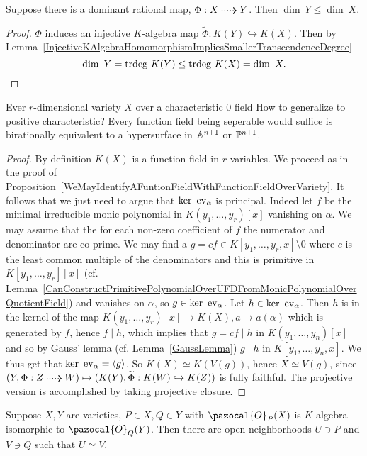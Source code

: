     \begin{proposition}
        Suppose there is a dominant rational map, $\Phi: X\dottedarrow Y$. Then $\dim\ Y \leq \dim \ X$.
    \end{proposition}
    \begin{proof}
        $\Phi$ induces an injective $K$-algebra map $\widetilde{\Phi}: K(Y)\hookrightarrow K(X)$. Then by Lemma~\ref{InjectiveKAlgebraHomomorphismImpliesSmallerTranscendenceDegree} 
        $$\dim \ Y = \mathrm{trdeg }\ K(Y)\leq \mathrm{trdeg }\ K(X) = \dim \ X.$$
    \end{proof}
    \begin{proposition}
        Ever $r$-dimensional variety $X$ over a characteristic $0$ field {\Large How to generalize to positive characteristic? Every function field being seperable would suffice} is birationally equivalent to a hypersurface in $\mathbb{A}^{n+1}$ or $\mathbb{P}^{n+1}$.
    \end{proposition}
    \begin{proof}
        By definition $K(X)$ is a function field in $r$ variables. We proceed as in the proof of Proposition~\ref{WeMayIdentifyAFuntionFieldWithFunctionFieldOverVariety}. It follows that we just need to argue that $\ker \ \mathrm{ev}_\alpha$ is principal. Indeed let $f$ be the minimal irreducible monic polynomial in $K(y_1,\dots,y_r)[x]$ vanishing on $\alpha$. We may assume that the for each non-zero coefficient of $f$ the numerator and denominator are co-prime. We may find a $g=cf\in K[y_1,\dots,y_r,x]\setminus 0$ where $c$ is the least common multiple of the denominators and this is primitive in $K[y_1,\dots,y_r][x]$ (cf. Lemma~\ref{CanConstructPrimitivePolynomialOverUFDFromMonicPolynomialOverQuotientField}) and vanishes on $\alpha$, so $g\in \ker\ \mathrm{ev}_\alpha$. Let $h\in \ker\ \mathrm{ev}_\alpha$. Then $h$ is in the kernel of the map $K(y_1,\dots,y_r)[x]\rightarrow K(X), a\mapsto a(\alpha)$ which is generated by $f$, hence $f\mid h$, which implies that $g=cf \mid h$ in $K(y_1,\dots,y_n)[x]$ and so by Gauss' lemma (cf. Lemma~\ref{GaussLemma}) $g\mid h$ in  $K[y_1,\dots,y_n,x].$ We thus get that $\ker\ \mathrm{ev}_\alpha = \langle g\rangle$. So $K(X)\simeq K(V(g))$, hence $X\simeq V(g)$, since $(Y,\Phi : Z\dottedarrow W)\mapsto (K(Y), \widetilde{\Phi} : K(W) \hookrightarrow K(Z))$ is fully faithful. The projective version is accomplished by taking projective closure. 
    \end{proof}
    \begin{proposition}
        Suppose $X,Y$ are varieties, $P\in X, Q\in Y$ with $\pazocal{O}_P(X)$ is $K$-algebra isomorphic to $\pazocal{O}_Q(Y)$. Then there are open neighborhoods $U\ni P$ and $V\ni Q$ such that $U\simeq V$.
    \end{proposition}
